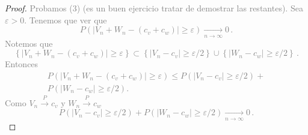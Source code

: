 \documentclass{beamer}
\theoremstyle{definition}
\newcommand{\ton}{\underset{n\to\infty}{\longrightarrow}}
\newcommand{\cp}{\overset{P}{\rightarrow}}
\begin{document}
\begin{frame}[noframenumbering]%
  \begin{proof}
  \textcolor{gray}{
    Probamos (3) (es un buen ejercicio tratar de demostrar las restantes). Sea $\varepsilon>0$. Tenemos que ver que
    \[P\left(\left\vert V_n+W_n -(c_v+c_w) \right\vert\geq \varepsilon \right) \ton 0\,.\]
    Notemos que 
    \[\left\lbrace\left\vert V_n+W_n -(c_v+c_w) \right\vert\geq \varepsilon
    \right\rbrace \subset \left\lbrace\left\vert V_n-c_v \right\vert\geq
      \varepsilon/2 \right\rbrace \cup \left\lbrace\left\vert W_n-c_w
      \right\vert\geq \varepsilon/2 \right\rbrace\,.\]
    Entonces 
    \begin{align*}
      P\left(\left\vert V_n+W_n -(c_v+c_w) \right\vert\geq \varepsilon \right) 
      \leq P\left(\left\vert V_n-c_v \right\vert\geq \varepsilon/2  \right)  +
      \\  P\left(\left\vert W_n-c_w \right\vert\geq \varepsilon/2  \right).
    \end{align*}
    Como $V_n\cp c_v$ y $W_n\cp c_w$
    \[P\left(\left\vert V_n-c_v \right\vert\geq \varepsilon/2 \right) +
    P\left(\left\vert W_n-c_w \right\vert\geq \varepsilon/2 \right) \ton
    0\,.\]
    }
  \end{proof}
\end{frame}
\end{document}
